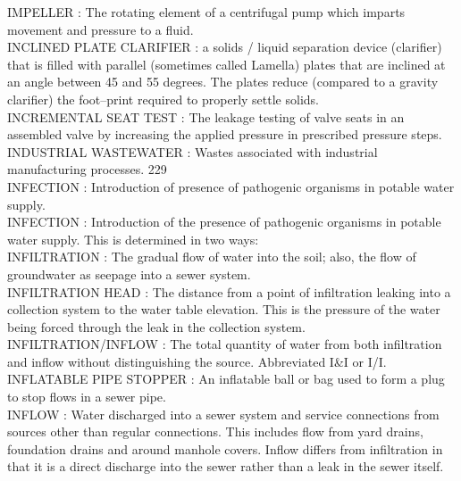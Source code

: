 \vspace{0.15cm}
IMPELLER :   The rotating element of a centrifugal pump which imparts movement and pressure to a fluid.\\
\vspace{0.15cm}
INCLINED PLATE CLARIFIER :  a solids / liquid separation device (clarifier) that is filled with parallel (sometimes called Lamella) plates that are inclined at an angle between 45 and 55 degrees. The plates reduce (compared to a gravity clarifier) the foot–print required to properly settle solids.\\
\vspace{0.15cm}
INCREMENTAL SEAT TEST :   The leakage testing of valve seats in an assembled valve by increasing the applied pressure in prescribed pressure steps.\\
\vspace{0.15cm}
INDUSTRIAL WASTEWATER :  Wastes associated with industrial manufacturing processes. 229 \\
\vspace{0.15cm}
INFECTION :   Introduction of presence of pathogenic organisms in potable water supply.\\
\vspace{0.15cm}
INFECTION :   Introduction of the presence of pathogenic organisms in potable water supply. This is determined in two ways:\\
\vspace{0.15cm}
INFILTRATION :  The gradual flow of water into the soil; also, the flow of groundwater as seepage into a sewer system.\\
\vspace{0.15cm}
INFILTRATION HEAD :  The distance from a point of infiltration leaking into a collection system to the water table elevation. This is the pressure of the water being forced through the leak in the collection system. \\
\vspace{0.15cm}
INFILTRATION/INFLOW :  The total quantity of water from both infiltration and inflow without distinguishing the source. Abbreviated I\&I or I/I. \\
\vspace{0.15cm}
INFLATABLE PIPE STOPPER :  An inflatable ball or bag used to form a plug to stop flows in a sewer pipe. \\
\vspace{0.15cm}
INFLOW :  Water discharged into a sewer system and service connections from sources other than regular connections. This includes flow from yard drains, foundation drains and around manhole covers. Inflow differs from infiltration in that it is a direct discharge into the sewer rather than a leak in the sewer itself.\\
